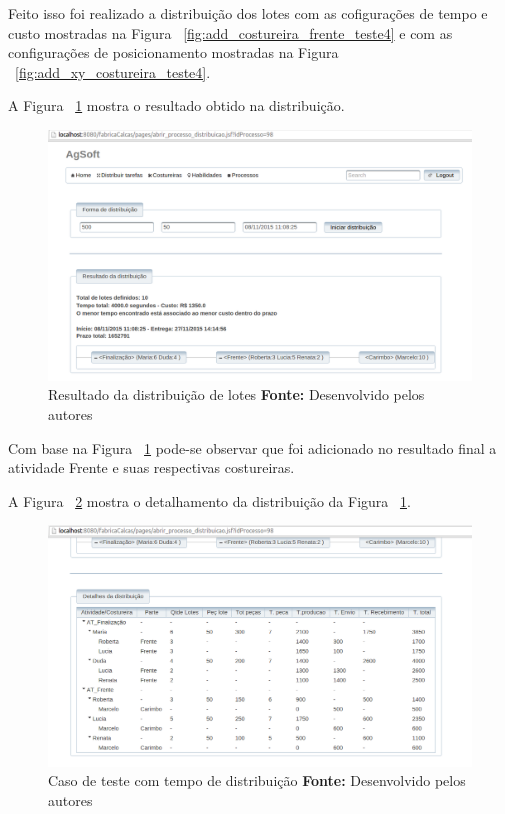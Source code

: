 \par Feito isso foi realizado a distribuição dos lotes com as cofigurações de
tempo e custo mostradas na Figura ~\ref{fig:add_costureira_frente_teste4} e com
as configurações de posicionamento mostradas na Figura
~\ref{fig:add_xy_costureira_teste4}.
\par A Figura ~\ref{fig:resultado1_teste5} mostra o resultado obtido na
distribuição.

\newpage

\begin{figure}[h!]
	\centerline{\includegraphics[scale=0.3]{./imagens/resultado1_teste5.png}}
	\caption[Resultado da distribuição de lotes]
	{Resultado da distribuição de lotes \textbf{Fonte:} Desenvolvido pelos autores}
	\label{fig:resultado1_teste5}
\end{figure}

\par Com base na Figura ~\ref{fig:resultado1_teste5} pode-se observar que foi
adicionado no resultado final a atividade Frente e suas respectivas costureiras.

\par A Figura ~\ref{fig:detalhamento1_teste5} mostra o detalhamento da
distribuição da Figura ~\ref{fig:resultado1_teste5}.

\begin{figure}[h!]
	\centerline{\includegraphics[scale=0.3]{./imagens/detalhamento1_teste5.png}}
	\caption[Distribuição das atividades]
	{Caso de teste com tempo de distribuição \textbf{Fonte:} Desenvolvido pelos autores}
	\label{fig:detalhamento1_teste5}
\end{figure}

